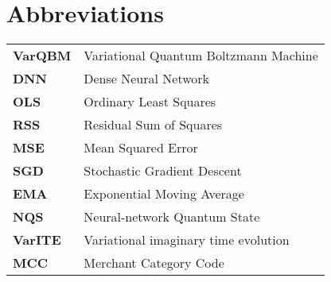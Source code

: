 \documentclass[../main.tex]{subfiles}
\begin{document}
\chapter{Abbreviations}

\begin{tabular}{ll}
\textbf{VarQBM}  & Variational Quantum Boltzmann Machine \\
\textbf{DNN}  & Dense Neural Network \\
\textbf{OLS}  & Ordinary Least Squares \\
\textbf{RSS}  & Residual Sum of Squares \\
\textbf{MSE}  & Mean Squared Error \\
\textbf{SGD}  & Stochastic Gradient Descent \\
\textbf{EMA}  & Exponential Moving Average \\
\textbf{NQS}  & Neural-network Quantum State \\
\textbf{VarITE}  & Variational imaginary time evolution \\
\textbf{MCC}  & Merchant Category Code\\
\end{tabular}
\end{document}
